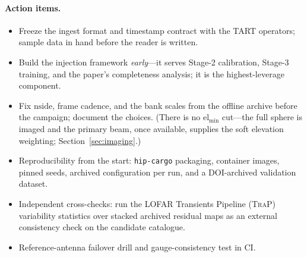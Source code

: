 \documentclass[11pt]{article}
\begin{document}
\paragraph{Action items.}
\begin{itemize}[leftmargin=*]
  \item Freeze the ingest format and timestamp contract with the TART operators; sample data in
        hand before the reader is written.
  \item Build the injection framework \emph{early}---it serves Stage-2 calibration, Stage-3
        training, and the paper's completeness analysis; it is the highest-leverage component.
  \item Fix $\mathrm{nside}$, frame cadence, and the bank scales from the offline archive before the
        campaign; document the choices. (There is no $\mathrm{el}_{\min}$ cut---the full sphere is
        imaged and the primary beam, once available, supplies the soft elevation weighting;
        Section~\ref{sec:imaging}.)
  \item Reproducibility from the start: \texttt{hip-cargo} packaging, container images, pinned
        seeds, archived configuration per run, and a DOI-archived validation dataset.
  \item Independent cross-checks: run the LOFAR Transients Pipeline (\textsc{TraP})~\cite{swinbank}
        variability statistics over stacked archived residual maps as an external consistency check
        on the candidate catalogue.
  \item Reference-antenna failover drill and gauge-consistency test in CI.
\end{itemize}
\end{document}
